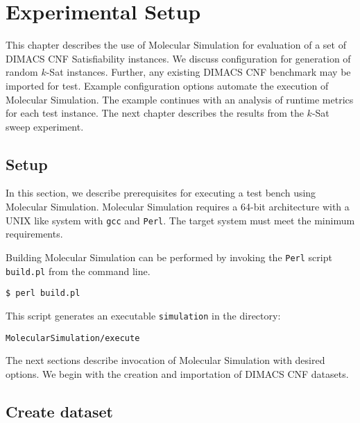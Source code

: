 \chapter{Experimental Setup}


This chapter describes the use of Molecular Simulation for evaluation of a set of DIMACS CNF {\sc Satisfiability} instances.  We discuss configuration for generation of random $k$-{\sc Sat} instances.  Further, any existing DIMACS CNF benchmark may be imported for test.  Example configuration options automate the execution of Molecular Simulation.  The example continues with an analysis of runtime metrics for each test instance.  The next chapter describes the results from the $k$-{\sc Sat} sweep experiment.

	\section{Setup}


In this section, we describe prerequisites for executing a test bench using Molecular Simulation.  Molecular Simulation requires a 64-bit architecture with a UNIX like system with \texttt{gcc} and \texttt{Perl}.  The target system must meet the minimum requirements.  

Building Molecular Simulation can be performed by invoking the \texttt{Perl} script \texttt{build.pl} from the command line.

\begin{center}
\texttt{\$ perl build.pl}
\end{center}

\noindent This script generates an executable \texttt{simulation} in the directory:

\begin{center}
\texttt{MolecularSimulation/execute}
\end{center}

The next sections describe invocation of Molecular Simulation with desired options.  We begin with the creation and importation of DIMACS CNF datasets.

		

	\section{Create dataset}

